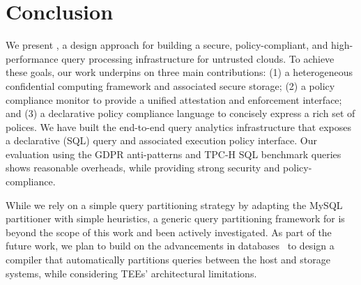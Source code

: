

\section{Conclusion}
\label{sec:conclusion}



We present \project, a design approach for building a secure, policy-compliant, and high-performance query processing infrastructure for untrusted clouds.
To achieve these goals, %
our work underpins on three main contributions: (1) a heterogeneous confidential computing framework and associated secure storage; (2) a policy compliance monitor to provide a unified attestation and enforcement interface; and (3) a declarative policy compliance language to concisely express a rich set of polices. 
We have built the end-to-end query analytics infrastructure that exposes a declarative (SQL) query and associated execution policy interface. 
Our evaluation using the GDPR anti-patterns and TPC-H SQL benchmark queries shows reasonable overheads, while providing strong security and policy-compliance.

 While we rely on a simple query partitioning strategy by adapting the MySQL partitioner with simple heuristics, a generic query partitioning framework for \csd is beyond the scope of this work and been actively investigated. As part of the future work, we plan to build on the advancements in databases~\cite{DBtoaster,Gu:2016:BFN:3001136.3001154} to design a compiler that automatically partitions queries between the host and storage systems, while considering TEEs' architectural limitations.%

